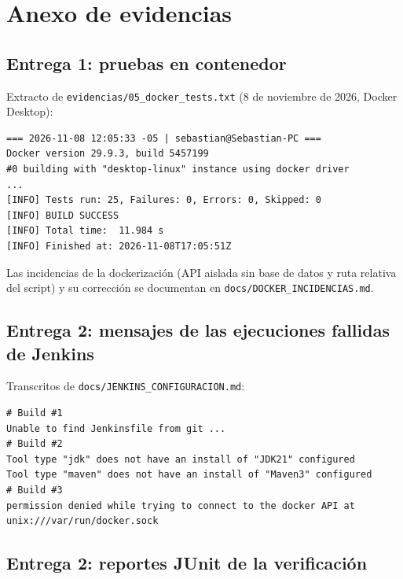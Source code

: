 \documentclass[11pt,a4paper]{article}
\newcommand{\ruta}[1]{\nolinkurl{#1}} %
\begin{document}
\clearpage
\appendix
\section{Anexo de evidencias}
\label{anx:evidencias}

\subsection{Entrega 1: pruebas en contenedor}

Extracto de \texttt{evidencias/05\_docker\_tests.txt} (8 de noviembre de 2026, Docker Desktop):

\begin{lstlisting}
=== 2026-11-08 12:05:33 -05 | sebastian@Sebastian-PC ===
Docker version 29.9.3, build 5457199
#0 building with "desktop-linux" instance using docker driver
...
[INFO] Tests run: 25, Failures: 0, Errors: 0, Skipped: 0
[INFO] BUILD SUCCESS
[INFO] Total time:  11.984 s
[INFO] Finished at: 2026-11-08T17:05:51Z
\end{lstlisting}

Las incidencias de la dockerización (API aislada sin base de datos y ruta relativa del script) y su
corrección se documentan en \texttt{docs/DOCKER\_INCIDENCIAS.md}.

\subsection{Entrega 2: mensajes de las ejecuciones fallidas de Jenkins}

Transcritos de \ruta{docs/JENKINS_CONFIGURACION.md}:

\begin{lstlisting}
# Build #1
Unable to find Jenkinsfile from git ...
# Build #2
Tool type "jdk" does not have an install of "JDK21" configured
Tool type "maven" does not have an install of "Maven3" configured
# Build #3
permission denied while trying to connect to the docker API at unix:///var/run/docker.sock
\end{lstlisting}

\subsection{Entrega 2: reportes JUnit de la verificación}
\label{anx:surefire}
\end{document}
